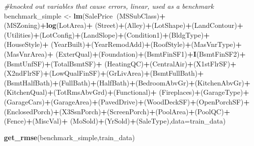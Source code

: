 \documentclass[]{article}
\newenvironment{Shaded}{\begin{snugshade}}{\end{snugshade}}
\newcommand{\CommentTok}[1]{\textcolor[rgb]{0.56,0.35,0.01}{\textit{#1}}}
\newcommand{\DataTypeTok}[1]{\textcolor[rgb]{0.13,0.29,0.53}{#1}}
\newcommand{\KeywordTok}[1]{\textcolor[rgb]{0.13,0.29,0.53}{\textbf{#1}}}
\newcommand{\NormalTok}[1]{#1}
\newcommand{\OperatorTok}[1]{\textcolor[rgb]{0.81,0.36,0.00}{\textbf{#1}}}
\newcommand{\StringTok}[1]{\textcolor[rgb]{0.31,0.60,0.02}{#1}}
\begin{document}
\begin{Shaded}
\begin{Highlighting}[]
\CommentTok{#knocked out variables that cause errors, linear, used as a benchmark}
\NormalTok{benchmark_simple <-}\StringTok{ }\KeywordTok{lm}\NormalTok{(SalePrice}\OperatorTok{~}\NormalTok{(MSSubClass)}\OperatorTok{+}\NormalTok{(MSZoning)}\OperatorTok{+}\KeywordTok{log}\NormalTok{(LotArea)}\OperatorTok{+}\StringTok{ }\NormalTok{(Street)}\OperatorTok{+}\NormalTok{(Alley)}\OperatorTok{+}\NormalTok{(LotShape)}\OperatorTok{+}\NormalTok{(LandContour)}\OperatorTok{+}
\StringTok{    }\NormalTok{(Utilities)}\OperatorTok{+}\NormalTok{(LotConfig)}\OperatorTok{+}\NormalTok{(LandSlope)}\OperatorTok{+}\NormalTok{(Condition1)}\OperatorTok{+}\NormalTok{(BldgType)}\OperatorTok{+}\NormalTok{(HouseStyle)}\OperatorTok{+}
\StringTok{    }\NormalTok{(YearBuilt)}\OperatorTok{+}\NormalTok{(YearRemodAdd)}\OperatorTok{+}\NormalTok{(RoofStyle)}\OperatorTok{+}\NormalTok{(MasVnrType)}\OperatorTok{+}\NormalTok{(MasVnrArea)}\OperatorTok{+}
\StringTok{    }\NormalTok{(ExterQual)}\OperatorTok{+}\NormalTok{(Foundation)}\OperatorTok{+}\NormalTok{(BsmtFinSF1)}\OperatorTok{+}\KeywordTok{I}\NormalTok{(BsmtFinSF2)}\OperatorTok{+}\NormalTok{(BsmtUnfSF)}\OperatorTok{+}\NormalTok{(TotalBsmtSF)}\OperatorTok{+}
\StringTok{    }\NormalTok{(HeatingQC)}\OperatorTok{+}\NormalTok{(CentralAir)}\OperatorTok{+}\NormalTok{(X1stFlrSF)}\OperatorTok{+}\NormalTok{(X2ndFlrSF)}\OperatorTok{+}\NormalTok{(LowQualFinSF)}\OperatorTok{+}\NormalTok{(GrLivArea)}\OperatorTok{+}\NormalTok{(BsmtFullBath)}\OperatorTok{+}
\StringTok{    }\NormalTok{(BsmtHalfBath)}\OperatorTok{+}\NormalTok{(FullBath)}\OperatorTok{+}\NormalTok{(HalfBath)}\OperatorTok{+}\NormalTok{(BedroomAbvGr)}\OperatorTok{+}\NormalTok{(KitchenAbvGr)}\OperatorTok{+}\NormalTok{(KitchenQual)}\OperatorTok{+}\NormalTok{(TotRmsAbvGrd)}\OperatorTok{+}\NormalTok{(Functional)}\OperatorTok{+}
\StringTok{    }\NormalTok{(Fireplaces)}\OperatorTok{+}\NormalTok{(GarageType)}\OperatorTok{+}\NormalTok{(GarageCars)}\OperatorTok{+}\NormalTok{(GarageArea)}\OperatorTok{+}\NormalTok{(PavedDrive)}\OperatorTok{+}\NormalTok{(WoodDeckSF)}\OperatorTok{+}\NormalTok{(OpenPorchSF)}\OperatorTok{+}
\StringTok{    }\NormalTok{(EnclosedPorch)}\OperatorTok{+}\NormalTok{(X3SsnPorch)}\OperatorTok{+}\NormalTok{(ScreenPorch)}\OperatorTok{+}\NormalTok{(PoolArea)}\OperatorTok{+}\NormalTok{(PoolQC)}\OperatorTok{+}\NormalTok{(Fence)}\OperatorTok{+}\NormalTok{(MiscVal)}\OperatorTok{+}
\StringTok{    }\NormalTok{(MoSold)}\OperatorTok{+}\NormalTok{(YrSold)}\OperatorTok{+}\NormalTok{(SaleType),}\DataTypeTok{data=}\NormalTok{train_data)}

\KeywordTok{get_rmse}\NormalTok{(benchmark_simple,train_data)}
\end{Highlighting}
\end{Shaded}
\end{document}
